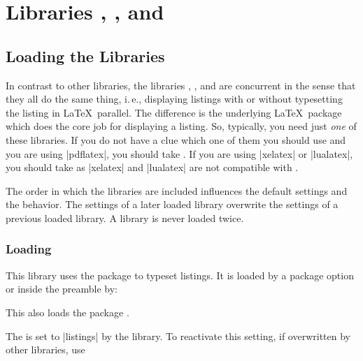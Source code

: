 \clearpage
\section{Libraries
  ,
  , and
  }\label{sec:listings}%
%

\subsection{Loading the Libraries}
In contrast to other  libraries, the libraries
, , and  are concurrent in the sense that
they all do the same thing, i.\,e., displaying listings with or without typesetting
the listing in \LaTeX\ parallel.
The difference is the underlying \LaTeX\ package which does the core job for
displaying a listing. So, typically, you need just \emph{one} of these
libraries. If you do not have a clue which one of them you should use
and you are using |pdflatex|, you should take .
If you are using |xelatex| or |lualatex|, you should take 
as |xelatex| and |lualatex| are not compatible with .

\begin{marker}
The order in which the libraries are included influences the default settings and
the  behavior. The settings of a later loaded library overwrite
the settings of a previous loaded library. A library is never loaded twice.
\end{marker}


\subsubsection{Loading }
This library uses the package  \cite{hoffmann:listings} to typeset
listings. It is loaded by a package option or inside the preamble by:
\begin{dispListing}
\end{dispListing}
This also loads the package  \cite{hoffmann:listings}.

The  is set to |listings| by the library.
To reactivate this setting, if overwritten by other libraries, use
\begin{dispListing}
\end{dispListing}

